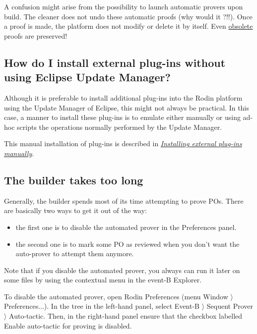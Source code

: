 A confusion might arise from the possibility to launch automatic provers upon build. The cleaner does not undo these automatic proofs (why would it ?!!). Once a proof is made, the platform does not modify or delete it by itself. Even \href{http://wiki.event-b.org/index.php/Proof_Purger_Interface#Why_proofs_become_obsolete}{obsolete} proofs are preserved!

\subsection{How do I install external plug-ins without using Eclipse Update Manager?}

Although it is preferable to install additional plug-ins into the Rodin platform using the Update Manager of Eclipse, this might not always be practical. In this case, a manner to install these plug-ins is to emulate either manually or using ad-hoc scripts the operations normally performed by the Update Manager. 

This manual installation of plug-ins is described in \href{http://wiki.event-b.org/index.php/Installing_external_plug-ins_manually}{\emph{Installing external plug-ins manually}}. 

\subsection{The builder takes too long}

Generally, the builder spends most of its time attempting to prove POs. There are basically two ways to get it out of the way: 

\begin{itemize}
	\item the first one is to disable the automated prover in the Preferences panel. 
	\item the second one is to mark some PO as reviewed when you don't want the auto-prover to attempt them anymore. 
\end{itemize}

Note that if you disable the automated prover, you always can run it later on some files by using the contextual menu in the event-B Explorer. 

To disable the automated prover, open Rodin Preferences 
(menu \textsf{Window $\rangle$ Preferences...}). In the tree in the left-hand panel, select \textsf{Event-B $\rangle$ Sequent Prover $\rangle$ Auto-tactic}. Then, in the right-hand panel ensure that the checkbox labelled Enable \textsf{auto-tactic} for proving is disabled. 

